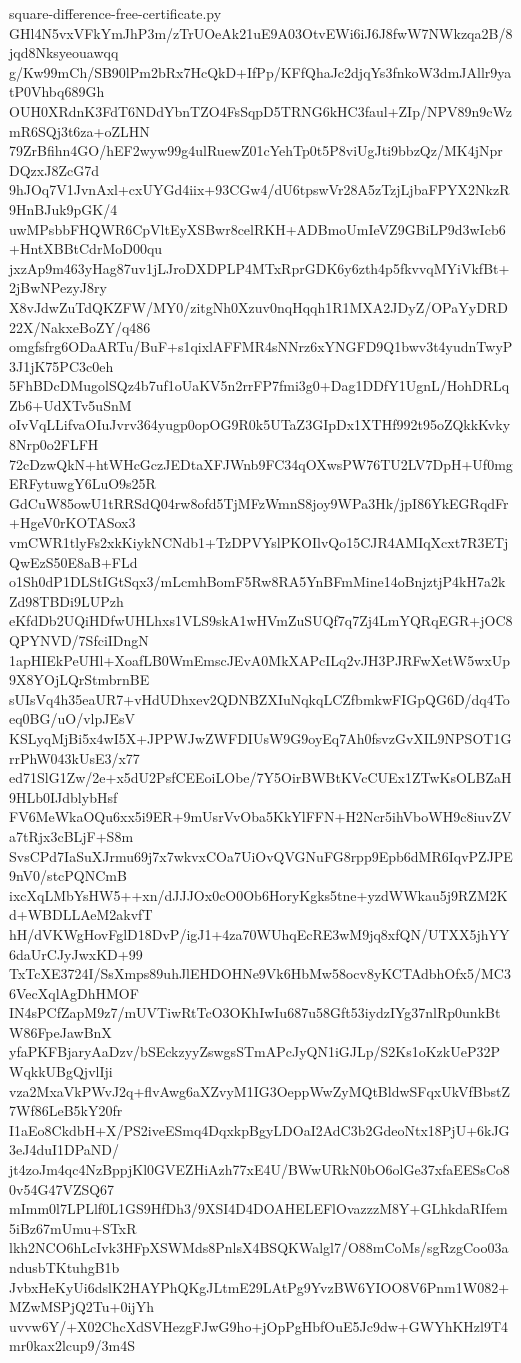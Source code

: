 \documentclass[11pt]{article}
\theoremstyle{definition}
\theoremstyle{remark}
\begin{document}
\begin{filecontents*}[overwrite]{square-difference-free-certificate.py}
GHl4N5vxVFkYmJhP3m/zTrUOeAk21uE9A03OtvEWi6iJ6J8fwW7NWkzqa2B/8jqd8Nksyeouawqq
g/Kw99mCh/SB90lPm2bRx7HcQkD+IfPp/KFfQhaJc2djqYs3fnkoW3dmJAllr9yatP0Vhbq689Gh
OUH0XRdnK3FdT6NDdYbnTZO4FsSqpD5TRNG6kHC3faul+ZIp/NPV89n9cWzmR6SQj3t6za+oZLHN
79ZrBfihn4GO/hEF2wyw99g4ulRuewZ01cYehTp0t5P8viUgJti9bbzQz/MK4jNprDQzxJ8ZcG7d
9hJOq7V1JvnAxl+cxUYGd4iix+93CGw4/dU6tpswVr28A5zTzjLjbaFPYX2NkzR9HnBJuk9pGK/4
uwMPsbbFHQWR6CpVltEyXSBwr8celRKH+ADBmoUmIeVZ9GBiLP9d3wIcb6+HntXBBtCdrMoD00qu
jxzAp9m463yHag87uv1jLJroDXDPLP4MTxRprGDK6y6zth4p5fkvvqMYiVkfBt+2jBwNPezyJ8ry
X8vJdwZuTdQKZFW/MY0/zitgNh0Xzuv0nqHqqh1R1MXA2JDyZ/OPaYyDRD22X/NakxeBoZY/q486
omgfsfrg6ODaARTu/BuF+s1qixlAFFMR4sNNrz6xYNGFD9Q1bwv3t4yudnTwyP3J1jK75PC3c0eh
5FhBDcDMugolSQz4b7uf1oUaKV5n2rrFP7fmi3g0+Dag1DDfY1UgnL/HohDRLqZb6+UdXTv5uSnM
oIvVqLLifvaOIuJvrv364yugp0opOG9R0k5UTaZ3GIpDx1XTHf992t95oZQkkKvky8Nrp0o2FLFH
72cDzwQkN+htWHcGczJEDtaXFJWnb9FC34qOXwsPW76TU2LV7DpH+Uf0mgERFytuwgY6LuO9s25R
GdCuW85owU1tRRSdQ04rw8ofd5TjMFzWmnS8joy9WPa3Hk/jpI86YkEGRqdFr+HgeV0rKOTASox3
vmCWR1tlyFs2xkKiykNCNdb1+TzDPVYslPKOIlvQo15CJR4AMIqXcxt7R3ETjQwEzS50E8aB+FLd
o1Sh0dP1DLStIGtSqx3/mLcmhBomF5Rw8RA5YnBFmMine14oBnjztjP4kH7a2kZd98TBDi9LUPzh
eKfdDb2UQiHDfwUHLhxs1VLS9skA1wHVmZuSUQf7q7Zj4LmYQRqEGR+jOC8QPYNVD/7SfciIDngN
1apHIEkPeUHl+XoafLB0WmEmscJEvA0MkXAPcILq2vJH3PJRFwXetW5wxUp9X8YOjLQrStmbrnBE
sUIsVq4h35eaUR7+vHdUDhxev2QDNBZXIuNqkqLCZfbmkwFIGpQG6D/dq4Toeq0BG/uO/vlpJEsV
KSLyqMjBi5x4wI5X+JPPWJwZWFDIUsW9G9oyEq7Ah0fsvzGvXIL9NPSOT1GrrPhW043kUsE3/x77
ed71SlG1Zw/2e+x5dU2PsfCEEoiLObe/7Y5OirBWBtKVcCUEx1ZTwKsOLBZaH9HLb0IJdblybHsf
FV6MeWkaOQu6xx5i9ER+9mUsrVvOba5KkYlFFN+H2Ncr5ihVboWH9c8iuvZVa7tRjx3cBLjF+S8m
SvsCPd7IaSuXJrmu69j7x7wkvxCOa7UiOvQVGNuFG8rpp9Epb6dMR6IqvPZJPE9nV0/stcPQNCmB
ixcXqLMbYsHW5++xn/dJJJOx0cO0Ob6HoryKgks5tne+yzdWWkau5j9RZM2Kd+WBDLLAeM2akvfT
hH/dVKWgHovFglD18DvP/igJ1+4za70WUhqEcRE3wM9jq8xfQN/UTXX5jhYY6daUrCJyJwxKD+99
TxTcXE3724I/SsXmps89uhJlEHDOHNe9Vk6HbMw58ocv8yKCTAdbhOfx5/MC36VecXqlAgDhHMOF
IN4sPCfZapM9z7/mUVTiwRtTcO3OKhIwIu687u58Gft53iydzIYg37nlRp0unkBtW86FpeJawBnX
yfaPKFBjaryAaDzv/bSEckzyyZswgsSTmAPcJyQN1iGJLp/S2Ks1oKzkUeP32PWqkkUBgQjvlIji
vza2MxaVkPWvJ2q+flvAwg6aXZvyM1IG3OeppWwZyMQtBldwSFqxUkVfBbstZ7Wf86LeB5kY20fr
I1aEo8CkdbH+X/PS2iveESmq4DqxkpBgyLDOaI2AdC3b2GdeoNtx18PjU+6kJG3eJ4duI1DPaND/
jt4zoJm4qc4NzBppjKl0GVEZHiAzh77xE4U/BWwURkN0bO6olGe37xfaEESsCo80v54G47VZSQ67
mImm0l7LPLlf0L1GS9HfDh3/9XSI4D4DOAHELEFlOvazzzM8Y+GLhkdaRIfem5iBz67mUmu+STxR
lkh2NCO6hLcIvk3HFpXSWMds8PnlsX4BSQKWalgl7/O88mCoMs/sgRzgCoo03andusbTKtuhgB1b
JvbxHeKyUi6dslK2HAYPhQKgJLtmE29LAtPg9YvzBW6YIOO8V6Pnm1W082+MZwMSPjQ2Tu+0ijYh
uvvw6Y/+X02ChcXdSVHezgFJwG9ho+jOpPgHbfOuE5Jc9dw+GWYhKHzl9T4mr0kax2lcup9/3m4S

\end{filecontents*}
\end{document}
